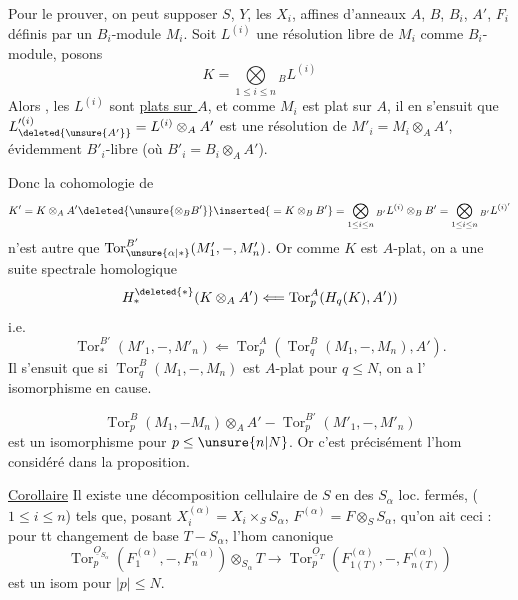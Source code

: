  Pour le prouver, on peut supposer $S$, $Y$, les $X_i$,  affines d'anneaux $A$, $B$, $B_i$, $A'$,  $F_i$ définis par  un $B_i$-module $M_i$. Soit $L^{(i)}$ une résolution libre de $M_i$ comme $B_i$-module, posons
\[
K=\mathop{\bigotimes}\limits_{1\leq i\leq n}{}_{B}L^{(i)}
\]
Alors , les $L^{(i)}$ sont \uline{plats sur $A$}, et comme $M_i$ est plat sur $A$, il en s'ensuit que $L'^{(i)}_{\deleted{\unsure{A'}}}=L^{(i)}\otimes_A A'$ est une résolution de $M'_i=M_i\otimes_A A'$, évidemment $B'_i$-libre (où $B'_i=B_i\otimes_A A'$).

Donc la cohomologie de
\[
K'=K\otimes_A A'\deleted{\unsure{\otimes_B B'}}\inserted{{}=K\otimes_B B'}=\mathop{\bigotimes}\limits_{1\leq i\leq n}{}_{B'}L^{(i)}\otimes_B B'=\mathop{\bigotimes}\limits_{1\leq i\leq n}{}_{B'}L^{(i)'}
\]
n'est autre que $\operatorname{Tor}_{\unsure{\alpha|*}}^{B'}(M'_1,-,M'_n)$. Or comme $K$ est $A$-plat, on a une suite spectrale homologique
\[
H_{*}^{\deleted{*}}(K\otimes_A A')\Longleftarrow\operatorname{Tor}_p^A(H_q(K),A'))
\]
i.e.
\[
\operatorname{Tor}_*^{B'}(M'_1,-,M'_n)\Longleftarrow\operatorname{Tor}_p^A(\operatorname{Tor}_q^B(M_1,-,M_n),A').
\]
Il s'ensuit que si $\operatorname{Tor}_q^B(M_1,-,M_n)$ est $A$-plat pour $q\leq N$, on a l' isomorphisme en cause.


\[
\operatorname{Tor}_p^B(M_1,-M_n)\otimes_A A'-\operatorname{Tor}_p^{B'}(M'_1,-,M'_n)
\]
est un isomorphisme pour $p\leq\unsure{n|N}$. Or c'est précisément l'hom considéré dans la proposition.

\uline{Corollaire}  Il existe une décomposition cellulaire de $S$ en des $S_\alpha$ loc. fermés, ($1\leq i\leq n$) tels que, posant  $X_i^{(\alpha)}=X_i\times_S S_\alpha$, $F^{(\alpha)}=F\otimes_S S_\alpha$,  qu'on ait ceci : pour tt changement de base $T-S_\alpha$, l'hom canonique
\[
\operatorname{Tor}_p^{\underline O_{S_\alpha}}(F_1^{(\alpha)},-,F_n^{(\alpha)})\otimes_{S_\alpha}T\longrightarrow\operatorname{Tor}_p^{\underline O_T}(F_{1(T)}^{(\alpha)},-,F_{n(T)}^{(\alpha)})
\]
est un isom pour $|p|\leq N$.

